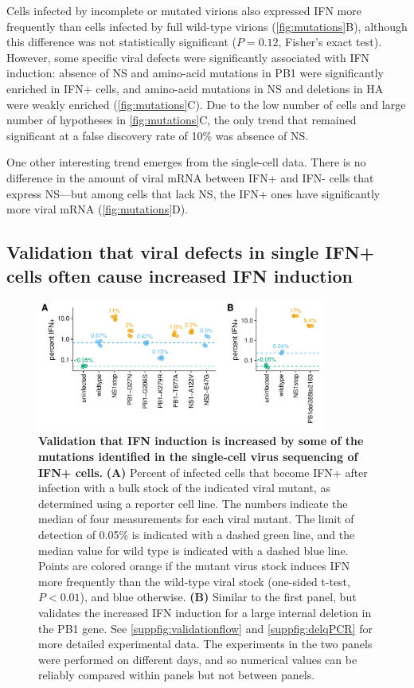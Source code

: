 \documentclass[10pt,letterpaper]{article}
\newcommand{\FIG}[1]{\autoref{fig:#1}}
\newcommand{\SUPPFIG}[1]{\autoref{suppfig:#1}}
\begin{document}
Cells infected by incomplete or mutated virions also expressed IFN more frequently than cells infected by full wild-type virions (\FIG{mutations}B), although this difference was not statistically significant ($P = 0.12$, Fisher's exact test).
However, some specific viral defects were significantly associated with IFN induction: absence of NS and amino-acid mutations in PB1 were significantly enriched in IFN+ cells, and amino-acid mutations in NS and deletions in HA were weakly enriched (\FIG{mutations}C).
Due to the low number of cells and large number of hypotheses in \FIG{mutations}C, the only trend that remained significant at a false discovery rate of 10\% was absence of NS.

One other interesting trend emerges from the single-cell data.
There is no difference in the amount of viral mRNA between IFN+ and IFN- cells that express NS---but among cells that lack NS, the IFN+ ones have significantly more viral mRNA (\FIG{mutations}D).

\subsection*{Validation that viral defects in single IFN+ cells often cause increased IFN induction}

\begin{figure}

\centerline{\includegraphics[width=0.85\textwidth]{figures/Validation_Figure/ifn_plot.pdf}}
\caption{
{\bf Validation that IFN induction is increased by some of the mutations identified in the single-cell virus sequencing of IFN+ cells.}
{\bf (A)}
Percent of infected cells that become IFN+ after infection with a bulk stock of the indicated viral mutant, as determined using a reporter cell line.
The numbers indicate the median of four measurements for each viral mutant.
The limit of detection of 0.05\% is indicated with a dashed green line, and the median value for wild type is indicated with a dashed blue line.
Points are colored orange if the mutant virus stock induces IFN more frequently than the wild-type viral stock (one-sided t-test, $P < 0.01$), and blue otherwise.
{\bf (B)}
Similar to the first panel, but validates the increased IFN induction for a large internal deletion in the PB1 gene.
See \SUPPFIG{validationflow} and \SUPPFIG{delqPCR} for more detailed experimental data.
The experiments in the two panels were performed on different days, and so numerical values can be reliably compared within panels but not between panels.
}
\label{fig:validation}

\end{figure}
\end{document}
